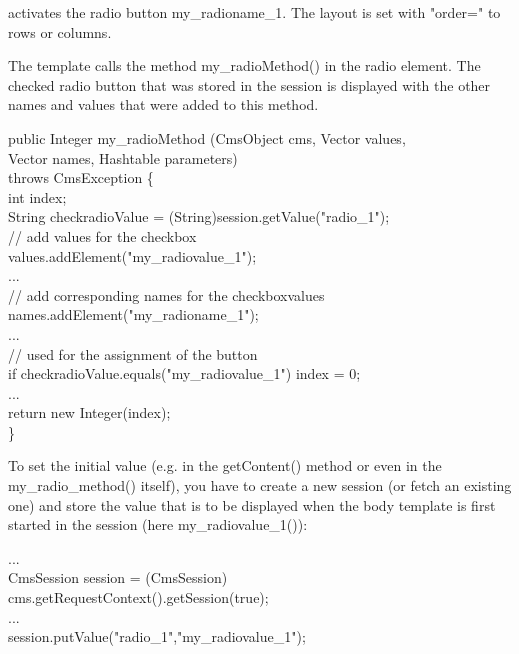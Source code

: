 activates the radio button {\name my\_radioname\_1}.
The layout is set with {\name "order="} to rows or columns.

The template calls the method {\meth my\_radioMethod()} in the radio element.
The checked radio button that was stored in the session is displayed
with the other names and values that were added to this method.

\begin{java}
public Integer my\_radioMethod (CmsObject cms, Vector values,\\
\jtabb                  Vector names, Hashtable parameters)\\
\jtabb                  throws CmsException \{\\
\jtaba                 int index;\\
\jtaba                String checkradioValue = (String)session.getValue("radio\_1");\\
\jtaba                // add values for the checkbox\\
\jtaba                   values.addElement("my\_radiovalue\_1");\\
\jtaba                ...\\
\jtaba                // add corresponding names for the checkboxvalues\\
\jtaba                names.addElement("my\_radioname\_1");\\
\jtaba                ...\\
\jtaba                // used for the assignment of the button\\
\jtaba                   if checkradioValue.equals("my\_radiovalue\_1") index = 0;\\
\jtaba                ...\\
\jtaba                return new Integer(index);\\
                \}\\
\end{java}

To set the initial value (e.g. in the {\meth getContent()} method or even in
the {\meth my\_radio\_method()} itself), you have to create a new session (or fetch
an existing one) and store the value that is to be displayed when the
body template is first started in the session (here {\meth my\_radiovalue\_1())}:

\begin{java}
...\\     
CmsSession session = (CmsSession)\\
cms.getRequestContext().getSession(true);\\
...\\     
session.putValue("radio\_1","my\_radiovalue\_1");\\
\end{java}

